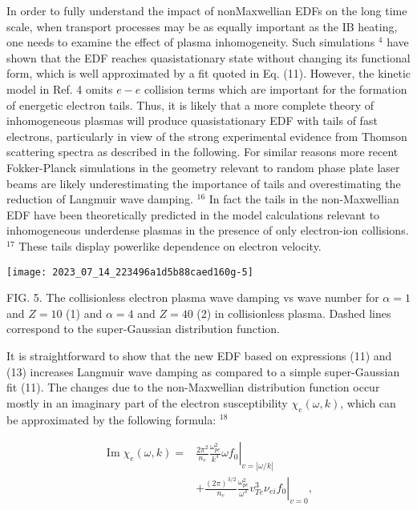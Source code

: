 \documentclass[10pt]{article}
\begin{document}
In order to fully understand the impact of nonMaxwellian EDFs on the long time scale, when transport processes may be as equally important as the IB heating, one needs to examine the effect of plasma inhomogeneity. Such simulations $^{4}$ have shown that the EDF reaches quasistationary state without changing its functional form, which is well approximated by a fit quoted in Eq. (11). However, the kinetic model in Ref. 4 omits $e-e$ collision terms which are important for the formation of energetic electron tails. Thus, it is likely that a more complete theory of inhomogeneous plasmas will produce quasistationary EDF with tails of fast electrons, particularly in view of the strong experimental evidence from Thomson scattering spectra as described in the following. For similar reasons more recent Fokker-Planck simulations in the geometry relevant to random phase plate laser beams are likely underestimating the importance of tails and overestimating the reduction of Langmuir wave damping. ${ }^{16}$ In fact the tails in the non-Maxwellian EDF have been theoretically predicted in the model calculations relevant to inhomogeneous underdense plasmas in the presence of only electron-ion collisions. ${ }^{17}$ These tails display powerlike dependence on electron velocity.

\begin{center}
\texttt{[image: 2023\_07\_14\_223496a1d5b88caed160g-5]}
\end{center}

FIG. 5. The collisionless electron plasma wave damping vs wave number for $\alpha=1$ and $Z=10$ (1) and $\alpha=4$ and $Z=40$ (2) in collisionless plasma. Dashed lines correspond to the super-Gaussian distribution function.

It is straightforward to show that the new EDF based on expressions (11) and (13) increases Langmuir wave damping as compared to a simple super-Gaussian fit (11). The changes due to the non-Maxwellian distribution function occur mostly in an imaginary part of the electron susceptibility $\chi_{e}(\omega, k)$, which can be approximated by the following formula: ${ }^{18}$

$$
\begin{aligned}
\operatorname{Im} \chi_{e}(\omega, k)= & \left.\frac{2 \pi^{2}}{n_{e}} \frac{\omega_{p e}^{2}}{k^{3}} \omega f_{0}\right|_{v=|\omega / k|} \\
& +\left.\frac{(2 \pi)^{3 / 2}}{n_{e}} \frac{\omega_{p e}^{2}}{\omega^{3}} v_{T e}^{3} \nu_{e i} f_{0}\right|_{v=0},
\end{aligned}
$$
\end{document}
